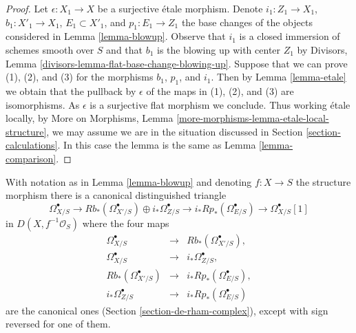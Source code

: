 \begin{proof}
Let $\epsilon : X_1 \to X$ be a surjective \'etale morphism. Denote
$i_1 : Z_1 \to X_1$, $b_1 : X'_1 \to X_1$, $E_1 \subset X'_1$, and
$p_1 : E_1 \to Z_1$ the base changes of the objects considered in
Lemma \ref{lemma-blowup}. Observe that $i_1$ is a closed immersion
of schemes smooth over $S$ and that $b_1$ is the blowing up with center
$Z_1$ by Divisors, Lemma \ref{divisors-lemma-flat-base-change-blowing-up}.
Suppose that we can prove (1), (2), and (3)
for the morphisms $b_1$, $p_1$, and $i_1$. Then by
Lemma \ref{lemma-etale} we obtain that the pullback by $\epsilon$
of the maps in (1), (2), and (3) are isomorphisms. As $\epsilon$
is a surjective flat morphism we conclude.
Thus working \'etale locally, by
More on Morphisms, Lemma \ref{more-morphisms-lemma-etale-local-structure},
we may assume we are in the situation discussed in
Section \ref{section-calculations}. In this case the lemma
is the same as Lemma \ref{lemma-comparison}.
\end{proof}

\begin{lemma}
\label{lemma-distinguished-triangle-blowup}
With notation as in Lemma \ref{lemma-blowup} and denoting $f : X \to S$
the structure morphism there is a canonical
distinguished triangle
$$
\Omega^\bullet_{X/S} \to
Rb_*(\Omega^\bullet_{X'/S}) \oplus i_*\Omega^\bullet_{Z/S} \to
i_*Rp_*(\Omega^\bullet_{E/S}) \to
\Omega^\bullet_{X/S}[1]
$$
in $D(X, f^{-1}\mathcal{O}_S)$ where the four maps
$$
\begin{matrix}
\Omega^\bullet_{X/S} & \to & Rb_*(\Omega^\bullet_{X'/S}), \\
\Omega^\bullet_{X/S} & \to & i_*\Omega^\bullet_{Z/S}, \\
Rb_*(\Omega^\bullet_{X'/S}) & \to & i_*Rp_*(\Omega^\bullet_{E/S}), \\
i_*\Omega^\bullet_{Z/S} & \to & i_*Rp_*(\Omega^\bullet_{E/S})
\end{matrix}
$$
are the canonical ones (Section \ref{section-de-rham-complex}),
except with sign reversed for one of them.
\end{lemma}

